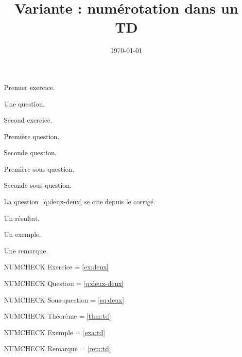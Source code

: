 \documentclass[11pt]{ocots-td}
\title{Variante : numérotation dans un TD}
\date{\today}
\begin{document}
\maketitle

\begin{exercise}[label=ex:un]
    Premier exercice.
    \begin{question}
        Une question.
    \end{question}
\end{exercise}

\begin{exercise}[label=ex:deux]
    Second exercice.
    \begin{question}
        Première question.
    \end{question}
    \begin{question}\label{q:deux-deux}
        Seconde question.
        \begin{subquestion}\label{sq:un}
            Première sous-question.
        \end{subquestion}
        \begin{subquestion}\label{sq:deux}
            Seconde sous-question.
        \end{subquestion}
    \end{question}
    \begin{correction}
        La question~\ref{q:deux-deux} se cite depuis le corrigé.
    \end{correction}
\end{exercise}

\begin{theorem}[label=thm:td]
    Un résultat.
\end{theorem}

\begin{example}[label=exa:td]
    Un exemple.
\end{example}

\begin{remark}[label=rem:td]
    Une remarque.
\end{remark}

NUMCHECK Exercice = \ref{ex:deux}

NUMCHECK Question = \ref{q:deux-deux}

NUMCHECK Sous-question = \ref{sq:deux}

NUMCHECK Théorème = \ref{thm:td}

NUMCHECK Exemple = \ref{exa:td}

NUMCHECK Remarque = \ref{rem:td}
\end{document}
